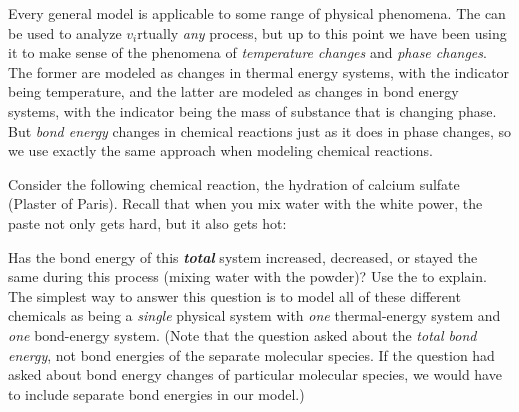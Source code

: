 \label{FNT1.1.4-1}

Every general model is applicable to some range of physical phenomena. The \EnergyInteractionModel{} can be used to analyze $v_i$rtually {\em any} process, but up to this point we have been using it to make sense of the phenomena of {\em temperature changes} and {\em phase changes}. The former are modeled as changes in thermal energy systems, with the indicator being temperature, and the latter are modeled as changes in bond energy systems, with the indicator being the mass of substance that is changing phase. But {\em bond energy} changes in chemical reactions just as it does in phase changes, so we use exactly the same approach when modeling chemical reactions.

Consider the following chemical reaction, the hydration of calcium sulfate (Plaster of Paris). Recall that when you mix water with the white power, the paste not only gets hard, but it also gets hot:
\begin{center}
\end{center}
Has the bond energy of this \textbf{\em total} system increased, decreased, or stayed the same during this process (mixing water with the powder)?  Use the \EnergyInteractionModel{} to explain. The simplest way to answer this question is to model all of these different chemicals as being a {\em single} physical system with {\em one} thermal-energy system and {\em one} bond-energy system. (Note that the question asked about the {\em total bond energy}, not bond energies of the separate molecular species. If the question had asked about bond energy changes of particular molecular species, we would have to include separate bond energies in our model.)


